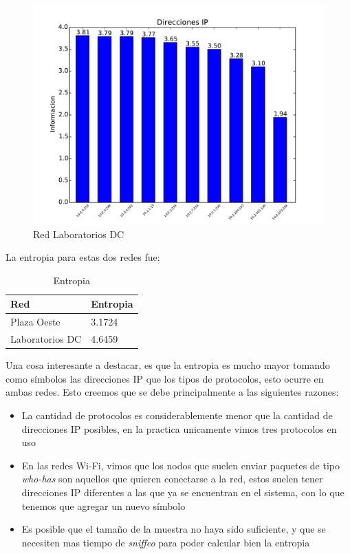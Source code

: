 \begin{figure}[H]
\begin{center}
\includegraphics[width=0.8\columnwidth]{graficos/dc_top_inf_s2.pdf}
\caption{Red Laboratorios DC}
\end{center}
\end{figure}

La entropia para estas dos redes fue:

\begin{table}[H]
\centering
\caption{Entropia}
\label{my-label}
\begin{tabular}{ll}
\hline
Red         & Entropia \\ \hline
Plaza Oeste & 3.1724   \\
Laboratorios DC    & 4.6459   \\ \hline
\end{tabular}
\end{table}

Una cosa interesante a destacar, es que la entropia es mucho mayor tomando como símbolos las direcciones IP que los tipos de protocolos, esto ocurre en ambas redes. Esto creemos que se debe principalmente a las siguientes razones:

\begin{itemize}
	\item La cantidad de protocolos es considerablemente menor que la cantidad de direcciones IP posibles, en la practica unicamente vimos tres protocolos en uso
	\item En las redes Wi-Fi, vimos que los nodos que suelen enviar paquetes de tipo \textit{who-has} son aquellos que quieren conectarse a la red, estos suelen tener direcciones IP diferentes a las que ya se encuentran en el sistema, con lo que tenemos que agregar un nuevo símbolo
	\item Es posible que el tamaño de la muestra no haya sido suficiente, y que se necesiten mas tiempo de \textit{sniffeo} para poder calcular bien la entropia
\end{itemize}

